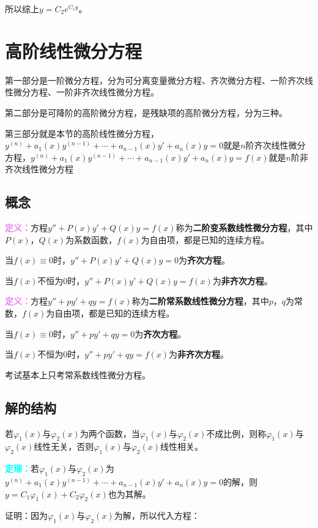 \documentclass[UTF8, 12pt]{ctexart}
\begin{document}
所以综上$y=C_2e^{C_1y}$。

\section{高阶线性微分方程}

第一部分是一阶微分方程，分为可分离变量微分方程、齐次微分方程、一阶齐次线性微分方程、一阶非齐次线性微分方程。

第二部分是可降阶的高阶微分方程，是残缺项的高阶微分方程，分为三种。

第三部分就是本节的高阶线性微分方程，$y^{(n)}+a_1(x)y^{(n-1)}+\cdots+a_{n-1}(x)y'+a_n(x)y=0$就是$n$阶齐次线性微分方程，$y^{(n)}+a_1(x)y^{(n-1)}+\cdots+a_{n-1}(x)y'+a_n(x)y=f(x)$就是$n$阶非齐次线性微分方程

\subsection{概念}

\textcolor{violet}{\textbf{定义：}}方程$y''+P(x)y'+Q(x)y=f(x)$称为\textbf{二阶变系数线性微分方程}，其中$P(x)$，$Q(x)$为系数函数，$f(x)$为自由项，都是已知的连续方程。

当$f(x)\equiv0$时，$y''+P(x)y'+Q(x)y=0$为\textbf{齐次方程}。

当$f(x)$不恒为0时，$y''+P(x)y'+Q(x)y=f(x)$为\textbf{非齐次方程}。

\textcolor{violet}{\textbf{定义：}}方程$y''+py'+qy=f(x)$称为\textbf{二阶常系数线性微分方程}，其中$p$，$q$为常数，$f(x)$为自由项，都是已知的连续方程。

当$f(x)\equiv0$时，$y''+py'+qy=0$为\textbf{齐次方程}。

当$f(x)$不恒为0时，$y''+py'+qy=f(x)$为\textbf{非齐次方程}。

考试基本上只考常系数线性微分方程。

\subsection{解的结构}

若$\varphi_1(x)$与$\varphi_2(x)$为两个函数，当$\varphi_1(x)$与$\varphi_2(x)$不成比例，则称$\varphi_1(x)$与$\varphi_2(x)$线性无关，否则$\varphi_1(x)$与$\varphi_2(x)$线性相关。

\textcolor{aqua}{\textbf{定理：}}若$\varphi_1(x)$与$\varphi_2(x)$为$y^{(n)}+a_1(x)y^{(n-1)}+\cdots+a_{n-1}(x)y'+a_n(x)y=0$的解，则$y=C_1\varphi_1(x)+C_2\varphi_2(x)$也为其解。

证明：因为$\varphi_1(x)$与$\varphi_2(x)$为解，所以代入方程：
\end{document}

